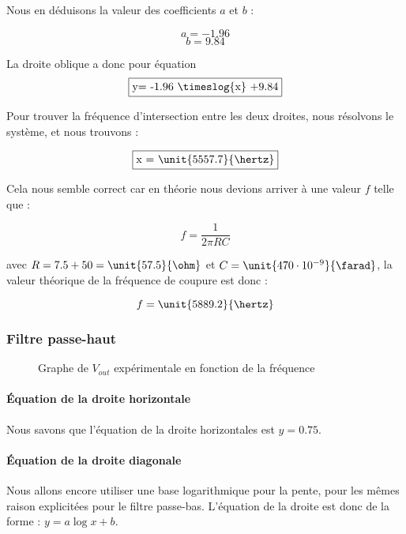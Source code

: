 Nous en déduisons la valeur des coefficients $a$ et $b$ :

$$a = -1.96$$
$$b= 9.84$$

La droite oblique a donc pour équation
$$\fbox{y= -1.96 \timeslog{x} +9.84}$$

Pour trouver la fréquence d'intersection entre les deux droites, nous résolvons le système, et nous
trouvons :

$$\fbox{x = \unit{5557.7}{\hertz}}$$

Cela nous semble correct car en théorie nous devions arriver à une valeur $f$ telle que :

$$f=\frac{1}{2\pi RC}$$

avec $R= 7.5 + 50 = \unit{57.5}{\ohm}$ et $C= \unit{470 \cdot 10^{-9}}{\farad}$, la valeur théorique de 
la fréquence de coupure est donc :

$$f= \unit{5889.2}{\hertz}$$

\subsubsection{Filtre passe-haut}

\begin{figure}[ht!]
\centering
{}
\caption{Graphe de $V_{out}$ expérimentale en fonction de la fréquence}
\label{lwp_ratio}
\end{figure}
\paragraph{Équation de la droite horizontale}

Nous savons que l'équation de la droite horizontales est $y = 0.75$.

\paragraph{Équation de la droite diagonale}

Nous allons encore utiliser une base logarithmique pour la pente, pour les mêmes raison explicitées pour
le filtre passe-bas.
L'équation de la droite est donc de la forme : $y=a \log{x}+b$.

